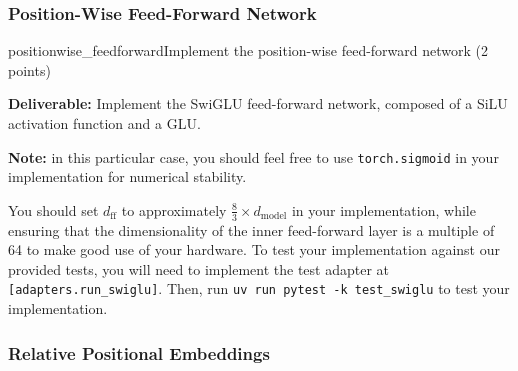 \subsubsection{Position-Wise Feed-Forward Network}

\begin{problembox}{positionwise\_feedforward}{Implement the position-wise feed-forward network (2 points)}

    \textbf{Deliverable:} \quad Implement the SwiGLU feed-forward network, composed of a SiLU activation function and a GLU.

    \vspace{0.5em}
    \textbf{Note:} in this particular case, you should feel free to use \texttt{torch.sigmoid} in your implementation for numerical stability.

    \vspace{0.5em}
    You should set $d_{\mathrm{ff}}$ to approximately $\frac{8}{3} \times d_{\mathrm{model}}$ in your implementation, while ensuring that the dimensionality of the inner feed-forward layer is a multiple of 64 to make good use of your hardware. To test your implementation against our provided tests, you will need to implement the test adapter at \textcolor{red!80!black}{\texttt{[adapters.run\_swiglu]}}. Then, run \texttt{uv run pytest -k test\_swiglu} to test your implementation.

\end{problembox}

\subsubsection{Relative Positional Embeddings}

